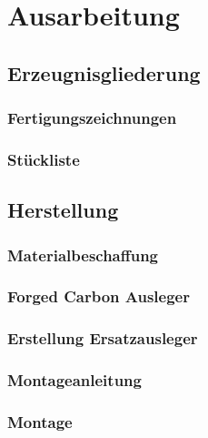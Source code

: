 \chapter{Ausarbeitung}

\section{Erzeugnisgliederung}
\subsection{Fertigungszeichnungen}
\subsection{Stückliste}


\section{Herstellung}
\subsection{Materialbeschaffung}
\subsection{Forged Carbon Ausleger}
\subsection{Erstellung Ersatzausleger}
\subsection{Montageanleitung}
\subsection{Montage}


